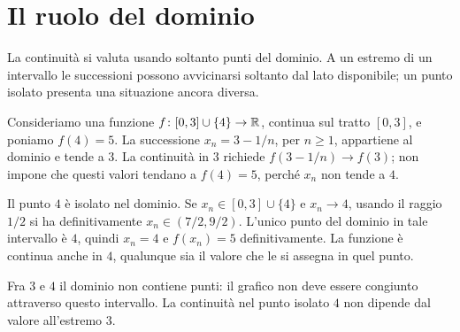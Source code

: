 \section{Il ruolo del dominio}

La continuità si valuta usando soltanto punti del dominio. A un estremo di un intervallo le successioni possono avvicinarsi soltanto dal lato disponibile; un punto isolato presenta una situazione ancora diversa.

\begin{esempio}
Consideriamo una funzione $f\colon[0,3]\cup\{4\}\to\mathbb{R}$, continua sul tratto $[0,3]$, e poniamo $f(4)=5$. La successione $x_n=3-1/n$, per $n\ge1$, appartiene al dominio e tende a $3$. La continuità in $3$ richiede $f(3-1/n)\to f(3)$; non impone che questi valori tendano a $f(4)=5$, perché $x_n$ non tende a $4$.

Il punto $4$ è isolato nel dominio. Se $x_n\in[0,3]\cup\{4\}$ e $x_n\to4$, usando il raggio $1/2$ si ha definitivamente $x_n\in(7/2,9/2)$. L'unico punto del dominio in tale intervallo è $4$, quindi $x_n=4$ e $f(x_n)=5$ definitivamente. La funzione è continua anche in $4$, qualunque sia il valore che le si assegna in quel punto.
\end{esempio}

\begin{schema}
\par\smallskip Fra $3$ e $4$ il dominio non contiene punti: il grafico non deve essere congiunto attraverso questo intervallo. La continuità nel punto isolato $4$ non dipende dal valore all'estremo $3$.
\end{schema}

